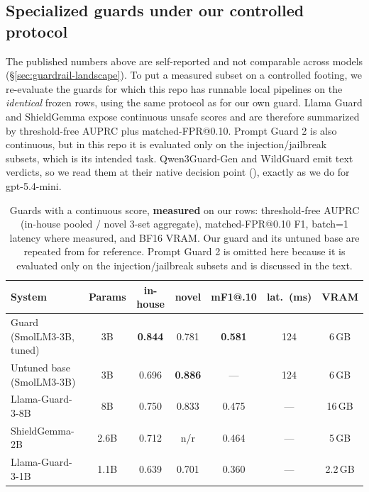 
\subsection{Specialized guards under our controlled protocol}
\label{sec:guardrail-measured}

The published numbers above are self-reported and not comparable across models (\S\ref{sec:guardrail-landscape}). To put a measured subset on a controlled footing, we re-evaluate the guards for which this repo has runnable local pipelines on the \emph{identical} frozen rows, using the same protocol as for our own guard. Llama Guard and ShieldGemma expose continuous unsafe scores and are therefore summarized by threshold-free AUPRC plus matched-FPR@0.10. Prompt Guard 2 is also continuous, but in this repo it is evaluated only on the injection/jailbreak subsets, which is its intended task. Qwen3Guard-Gen and WildGuard emit text verdicts, so we read them at their native decision point (), exactly as we do for gpt-5.4-mini.

\begin{table}[t]
\small\centering\setlength{\tabcolsep}{4pt}
\caption{Guards with a continuous score, \textbf{measured} on our rows: threshold-free AUPRC (in-house pooled / novel 3-set aggregate), matched-FPR@0.10 F1, batch=1 latency where measured, and BF16 VRAM. Our guard and its untuned base are repeated from  for reference. Prompt Guard 2 is omitted here because it is evaluated only on the injection/jailbreak subsets and is discussed in the text.}
\label{tab:gr-auprc}
\begin{tabular}{lcccccc}
\toprule
System & Params & in-house & novel & mF1@.10 & lat.\ (ms) & VRAM \\
\midrule
Guard (SmolLM3-3B, tuned) & 3B & \textbf{0.844} & 0.781 & \textbf{0.581} & 124 & 6\,GB \\
Untuned base (SmolLM3-3B) & 3B & 0.696 & \textbf{0.886} & --- & 124 & 6\,GB \\
Llama-Guard-3-8B          & 8B & 0.750 & 0.833 & 0.475 & --- & 16\,GB \\
ShieldGemma-2B            & 2.6B & 0.712 & n/r & 0.464 & --- & 5\,GB \\
Llama-Guard-3-1B          & 1.1B & 0.639 & 0.701 & 0.360 & --- & 2.2\,GB \\
\bottomrule
\end{tabular}
\end{table}

